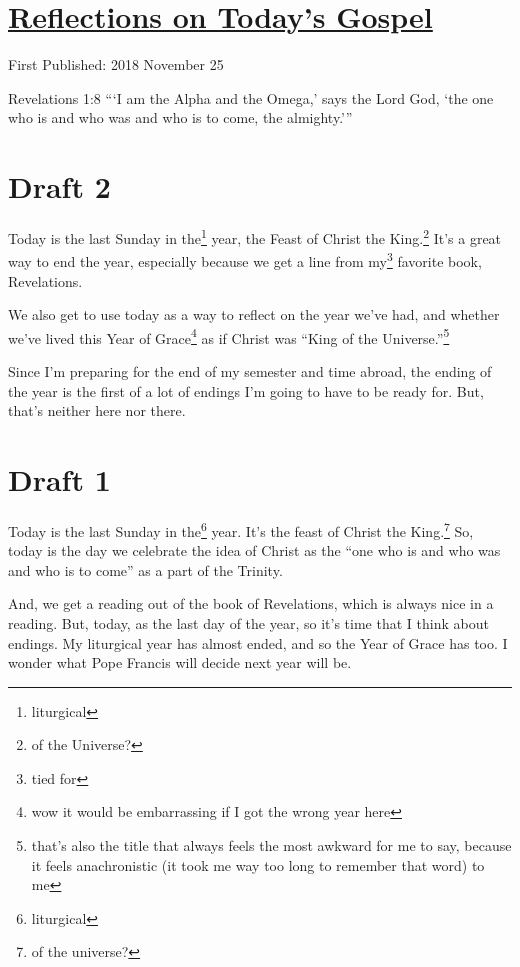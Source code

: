 \documentclass[12pt]{article}[titlepage]
\newcommand{\say}[1]{``#1''}
\newcommand{\nsay}[1]{`#1'}
\newcommand{\1}{\={a}}
\newcommand{\2}{\={e}}
\newcommand{\3}{\={\i}}
\newcommand{\4}{\=o}
\newcommand{\5}{\=u}
\newcommand{\6}{\={A}}
\renewcommand{\,}{\textsuperscript{,}}
\begin{document}
\doublespacing
\section{\href{reflections-on-readings-christ-king-b.html}{Reflections on Today's Gospel}}
First Published: 2018 November 25

Revelations 1:8 \say{\nsay{I am the Alpha and the Omega,} says the Lord God, \nsay{the one who is and who was and who is to come, the almighty.}}
\section{Draft 2}
Today is the last Sunday in the\footnote{liturgical} year, the Feast of Christ the King.\footnote{of the Universe?}
It's a great way to end the year, especially because we get a line from my\footnote{tied for} favorite book, Revelations.

We also get to use today as a way to reflect on the year we've had, and whether we've lived this Year of Grace\footnote{wow it would be embarrassing if I got the wrong year here} as if Christ was \say{King of the Universe.}\footnote{that's also the title that always feels the most awkward for me to say, because it feels anachronistic (it took me way too long to remember that word) to me}

Since I'm preparing for the end of my semester and time abroad, the ending of the year is the first of a lot of endings I'm going to have to be ready for.
But, that's neither here nor there.
\section{Draft 1}
Today is the last Sunday in the\footnote{liturgical} year.
It's the feast of Christ the King.\footnote{of the universe?}
So, today is the day we celebrate the idea of Christ as the \say{one who is and who was and who is to come} as a part of the Trinity.

And, we get a reading out of the book of Revelations, which is always nice in a reading.
But, today, as the last day of the year, so it's time that I think about endings.
My liturgical year has almost ended, and so the Year of Grace has too.
I wonder what Pope Francis will decide next year will be.
\end{document}
